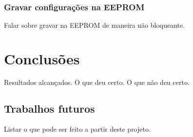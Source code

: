 \documentclass[brazil,pagestart=firstchapter]{abnt}
\begin{document}
\subsection{Gravar configurações na EEPROM\label{sec:eeprom}}

Falar sobre gravar na EEPROM de maneira não bloqueante.

\chapter{Conclusões\label{cap:conclusoes}}

Resultados alcançados. O que deu certo. O que não deu certo.

\section{Trabalhos futuros\label{sec:trabalhos_futuros}}

Listar o que pode ser feito a partir deste projeto.







\anexo
\end{document}
